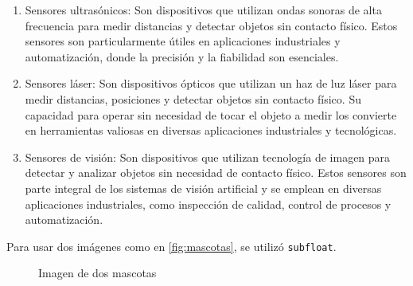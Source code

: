 \begin{enumerate}
\begin{enumerate}
			\begin{figure}[h]
				\centering
				\hfill
			\end{figure}
			\item Sensores ultrasónicos: Son dispositivos que utilizan ondas sonoras de alta frecuencia para medir distancias y detectar objetos sin contacto físico. Estos sensores son particularmente útiles en aplicaciones industriales y automatización, donde la precisión y la fiabilidad son esenciales.\cite{ultrason}\\ 
			\begin{figure}[h]
				\centering
				\hfill
			\end{figure}
			\item Sensores láser: Son dispositivos ópticos que utilizan un haz de luz láser para medir distancias, posiciones y detectar objetos sin contacto físico. Su capacidad para operar sin necesidad de tocar el objeto a medir los convierte en herramientas valiosas en diversas aplicaciones industriales y tecnológicas.\cite{Slaser}\\ 
			\begin{figure}[h]
				\centering
				\hfill
			\end{figure}
			\item Sensores de visión: Son dispositivos que utilizan tecnología de imagen para detectar y analizar objetos sin necesidad de contacto físico. Estos sensores son parte integral de los sistemas de visión artificial y se emplean en diversas aplicaciones industriales, como inspección de calidad, control de procesos y automatización.\cite{Svision}\\ 
			\begin{figure}[h]
				\centering
				\hfill
			\end{figure}
		\end{enumerate}
	\end{enumerate}

Para usar dos imágenes como en \autoref{fig:mascotas}, se utilizó \texttt{subfloat}.
\begin{figure}[h]
	\centering
	\hfill
	\caption{Imagen de dos mascotas}
	\label{fig:mascotas}
\end{figure}